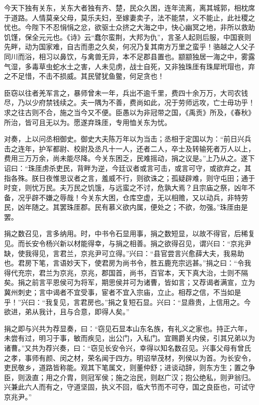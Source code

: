 \documentclass[]{article}
\begin{document}
今天下独有关东，关东大者独有齐、楚，民众久困，连年流离，离其城郭，相枕席于道路。人情莫亲父母，莫乐夫妇，至嫁妻卖子，法不能禁，义不能止，此社稷之忧也。今陛下不忍悁悁之忿，欲驱士众挤之大海之中，快心幽冥之地，非所以救助饥馑，保全元元也。《诗》云``蠢尔蛮荆，大邦为仇''，言圣人起则后服，中国衰则先畔，动为国家难，自古而患之久矣，何况乃复其南方万里之蛮乎！骆越之人父子同川而浴，相习以鼻饮，与禽兽无异，本不足郡县置也。颛颛独居一海之中，雾露气湿，多毒草虫蛇水土之害，人未见虏，战士自死，又非独珠厓有珠犀玳瑁也，弃之不足惜，不击不损威。其民譬犹鱼鳖，何足贪也！

臣窃以往者羌军言之，暴师曾未一年，兵出不逾千里，费四十余万万，大司农钱尽，乃以少府禁钱续之。夫一隅为不善，费尚如此，况于劳师远攻，亡士毋功乎！求之往古则不合，施之当今又不便。臣愚以为非冠带之国，《禹贡》所及，《春秋》所治，皆可且无以为。愿遂弃珠厓，专用恤关东为忧。

对奏，上以问丞相御史。御史大夫陈万年以为当击；丞相于定国以为：``前日兴兵击之连年，护军都尉、校尉及丞凡十一人，还者二人，卒士及转输死者万人以上，费用三万万余，尚未能尽降。今关东困乏，民难摇动，捐之议是。''上乃从之。遂下诏曰：``珠厓虏杀吏民，背畔为逆，今廷议者或言可击，或言可守，或欲弃之，其指各殊。朕日夜惟思议者之言，羞威不行，则欲诛之；孤疑辟难，则守屯田；通于时变，则忧万民。夫万民之饥饿，与远蛮之不讨，危孰大焉？且宗庙之祭，凶年不备，况乎辟不嫌之辱哉！今关东大困，仓库空虚，无以相赡，又以动兵，非特劳民，凶年随之。其罢珠厓郡。民有慕义欲内属，便处之；不欲，勿强。''珠厓由是罢。

捐之数召见，言多纳用。时，中书令石显用事，捐之数短显，以故不得官，后稀复见。而长安令杨兴新以材能得幸，与捐之相善。捐之欲得召见，谓兴曰：``京兆尹缺，使我得见，言君兰，京兆尹可立得。''兴曰：``县官尝言兴愈薛大夫，我易助也。君房下笔，言语妙天下，使君房为尚书令，胜五鹿充宗远甚。''捐之曰：``令我得代充宗，君兰为京兆，京兆，郡国首，尚书，百官本，天下真大治，士则不隔矣。捐之前言平恩侯可为将军，期思侯并可为诸曹，皆如言；又荐谒者满宣，立为冀州刺史；言中谒者不宜受事，宦者不宜入宗庙，立止。相荐之信，不当如是乎！''兴曰：``我复见，言君房也。''捐之复短石显。兴曰：``显鼎贵，上信用之。今欲进，弟从我计，且与合意，即得人矣。''

捐之即与兴共为荐显奏，曰：``窃见石显本山东名族，有礼义之家也。持正六年，未尝有过，明习于事，敏而疾见，出公门，入私门。宜赐爵关内侯，引其兄弟以为诸曹。''又共为荐兴奏，曰：``窃见长安令兴，幸得以知名数召见。兴事父母有曾氏之孝，事师有颜、闵之材，荣名闻于四方。明诏举茂材，列侯以为首。为长安令，吏民敬乡，道路皆称能。观其下笔属文，则董仲舒；进谈动辞，则东方生；置之争臣，则汲直；用之介胄，则冠军侯；施之治民，则赵广汉；抱公绝私，则尹翁归。兴兼此六人而有之，守道坚固，执义不回，临大节而不可夺，国之良臣也，可试守京兆尹。''
\end{document}
